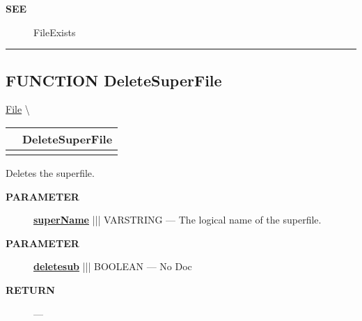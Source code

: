 \par
\begin{description}
\item [\colorbox{tagtype}{\color{white} \textbf{\textsf{SEE}}}] FileExists
\end{description}




\rule{\linewidth}{0.5pt}
\subsection*{\textsf{\colorbox{headtoc}{\color{white} FUNCTION}
DeleteSuperFile}}

\hypertarget{ecldoc:file.deletesuperfile}{}
\hspace{0pt} \hyperlink{ecldoc:File}{File} \textbackslash 

{\renewcommand{\arraystretch}{1.5}
\begin{tabularx}{\textwidth}{|>{\raggedright\arraybackslash}l|X|}
\hline
\hspace{0pt}\mytexttt{\color{red} } & \textbf{DeleteSuperFile} \\
\hline
\multicolumn{2}{|>{\raggedright\arraybackslash}X|}{\hspace{0pt}\mytexttt{\color{param} (varstring superName, boolean deletesub=FALSE)}} \\
\hline
\end{tabularx}
}

\par





Deletes the superfile.






\par
\begin{description}
\item [\colorbox{tagtype}{\color{white} \textbf{\textsf{PARAMETER}}}] \textbf{\underline{superName}} ||| VARSTRING --- The logical name of the superfile.
\item [\colorbox{tagtype}{\color{white} \textbf{\textsf{PARAMETER}}}] \textbf{\underline{deletesub}} ||| BOOLEAN --- No Doc
\end{description}







\par
\begin{description}
\item [\colorbox{tagtype}{\color{white} \textbf{\textsf{RETURN}}}] \textbf{} --- 
\end{description}






